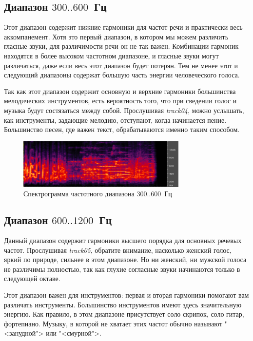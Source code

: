 \documentclass[oneside, final, 14pt]{extreport}
\begin{document}
\subsection{Диапазон $300..600$~Гц}
Этот диапазон содержит нижние гармоники для частот речи и практически весь аккомпанемент. Хотя это первый диапазон, в котором мы можем различить гласные звуки, для различимости речи он не так важен. Комбинации гармоник находятся в более высоком частотном диапазоне, и гласные звуки могут различаться, даже если весь этот диапазон будет потерян. Тем не менее этот и следующий диапазоны содержат большую часть энергии человеческого голоса.

Так как этот диапазон содержит основную и верхние гармоники большинства мелодических инструментов, есть вероятность того, что при сведении голос и музыка будут состязаться между собой. Прослушивая \emph{track04}, можно услышать, как инструменты, задающие мелодию, отступают, когда начинается пение. Большинство песен, где важен текст, обрабатываются именно таким способом.

\begin{figure}[h]
  \centering
  \includegraphics[width=0.75\textwidth]{pic-specter-03}
  \caption{Спектрограмма частотного диапазона $300..600$~Гц}
  \label{pic-specter-03}
\end{figure}

\subsection{Диапазон $600..1200$~Гц}
Данный диапазон содержит гармоники высшего порядка для основных речевых частот. Прослушивая \emph{track05}, обратите внимание, насколько женский голос, яркий по природе, сильнее в этом диапазоне. Но ни женский, ни мужской голоса не различимы полностью, так как глухие согласные звуки начинаются только в следующей октаве.

Этот диапазон важен для инструментов: первая и вторая гармоники помогают вам различать инструменты. Большинство инструментов имеют здесь значительную энергию. Как правило, в этом диапазоне присутствует соло скрипок, соло гитар, фортепиано. Музыку, в которой не хватает этих частот обычно называют "<занудной"> или "<смурной">.
\end{document}
